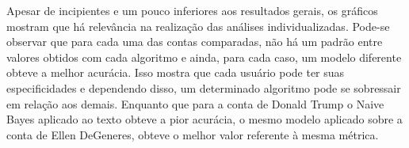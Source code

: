 \documentclass[oneside,openright,12pt]{ufsm_2015} %
\begin{document}
    \par Apesar de incipientes e um pouco inferiores aos resultados gerais, os gráficos mostram que há relevância na realização das análises individualizadas. Pode-se observar que para cada uma das contas comparadas, não há um padrão entre valores obtidos com cada algoritmo e ainda, para cada caso, um modelo diferente obteve a melhor acurácia. Isso mostra que cada usuário pode ter suas especificidades e dependendo disso, um determinado algoritmo pode se sobressair em relação aos demais. Enquanto que para a conta de Donald Trump o Naive Bayes aplicado ao texto obteve a pior acurácia, o mesmo modelo aplicado sobre a conta de Ellen DeGeneres, obteve o melhor valor referente à mesma métrica.
    
    \mydata
    
\end{document}
